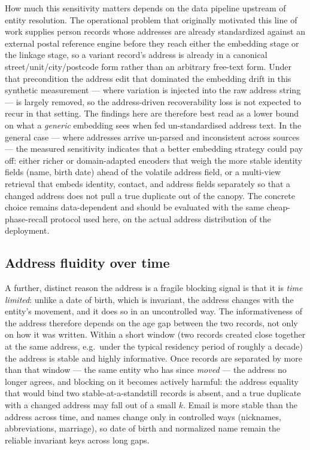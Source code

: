 \documentclass[11pt]{article}
\begin{document}
How much this sensitivity matters depends on the data pipeline upstream of entity resolution.
The operational problem that originally motivated this line of work supplies person records
whose addresses are already standardized against an external postal reference engine before
they reach either the embedding stage or the linkage stage, so a variant record's address is
already in a canonical street/unit/city/postcode form rather than an arbitrary free-text form.
Under that precondition the address edit that dominated the embedding drift in this synthetic
measurement --- where variation is injected into the raw address string --- is largely
removed, so the address-driven recoverability loss is not expected to recur in that setting.
The findings here are therefore best read as a lower bound on what a \emph{generic}
embedding sees when fed un-standardised address text. In the general case --- where addresses
arrive un-parsed and inconsistent across sources --- the measured sensitivity indicates that
a better embedding strategy could pay off: either richer or domain-adapted encoders that
weigh the more stable identity fields (name, birth date) ahead of the volatile address field,
or a multi-view retrieval that embeds identity, contact, and address fields separately so that
a changed address does not pull a true duplicate out of the canopy. The concrete choice remains
data-dependent and should be evaluated with the same cheap-phase-recall protocol used here,
on the actual address distribution of the deployment.

\subsection{Address fluidity over time}
A further, distinct reason the address is a fragile blocking signal is that it is \emph{time
limited}: unlike a date of birth, which is invariant, the address changes with the entity's
movement, and it does so in an uncontrolled way. The informativeness of the address therefore
depends on the age gap between the two records, not only on how it was written. Within a short
window (two records created close together at the same address, e.g.\ under the typical
residency period of roughly a decade) the address is stable and highly informative. Once
records are separated by more than that window --- the same entity who has since \emph{moved} ---
the address no longer agrees, and blocking on it becomes actively harmful: the address equality
that would bind two stable-at-a-standstill records is absent, and a true duplicate with a
changed address may fall out of a small $k$. Email is more stable than the address across time,
and names change only in controlled ways (nicknames, abbreviations, marriage), so date of birth
and normalized name remain the reliable invariant keys across long gaps.
\end{document}
